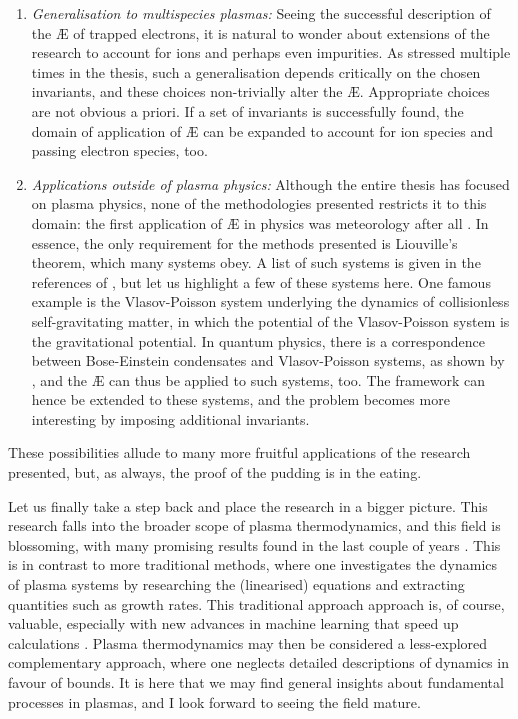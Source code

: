 \begin{enumerate}
    \item {\it Generalisation to multispecies plasmas:} Seeing the successful description of the \AE{} of trapped electrons, it is natural to wonder about extensions of the research to account for ions and perhaps even impurities. As stressed multiple times in the thesis, such a generalisation depends critically on the chosen invariants, and these choices non-trivially alter the \AE{}. Appropriate choices are not obvious a priori. If a set of invariants is successfully found, the domain of application of \AE{} can be expanded to account for ion species and passing electron species, too. 
    \item {\it Applications outside of plasma physics:} Although the entire thesis has focused on plasma physics, none of the methodologies presented restricts it to this domain: the first application of \AE{} in physics was meteorology after all \cite{lorenz1955available}. In essence, the only requirement for the methods presented is Liouville's theorem, which many systems obey. A list of such systems is given in the references of \cite{kolmes2020available,mackenbach2022available}, but let us highlight a few of these systems here. One famous example is the Vlasov-Poisson system underlying the dynamics of collisionless self-gravitating matter, in which the potential of the Vlasov-Poisson system is the gravitational potential. In quantum physics, there is a correspondence between Bose-Einstein condensates and Vlasov-Poisson systems, as shown by \citet{mocz2018schrodinger}, and the \AE{} can thus be applied to such systems, too. The framework can hence be extended to these systems, and the problem becomes more interesting by imposing additional invariants.
\end{enumerate}
These possibilities allude to many more fruitful applications of the research presented, but, as always, the proof of the pudding is in the eating. \par 
Let us finally take a step back and place the research in a bigger picture. This research falls into the broader scope of plasma thermodynamics, and this field is blossoming, with many promising results found in the last couple of years \cite{helander2017available,helander2020available,kolmes2020recovering,helander2022energetic,plunk2022energetic,kolmes2022minimum,ewart2022collisionless,plunk2023energetic,ewart2023non}. This is in contrast to more traditional methods, where one investigates the dynamics of plasma systems by researching the (linearised) equations and extracting quantities such as growth rates. This traditional approach approach is, of course, valuable, especially with new advances in machine learning that speed up calculations \cite{hui2021machine,mathews2021turbulent,kube2021machine,ho2021neural,anirudh20222022}. Plasma thermodynamics may then be considered a less-explored complementary approach, where one neglects detailed descriptions of dynamics in favour of bounds. It is here that we may find general insights about fundamental processes in plasmas, and I look forward to seeing the field mature.